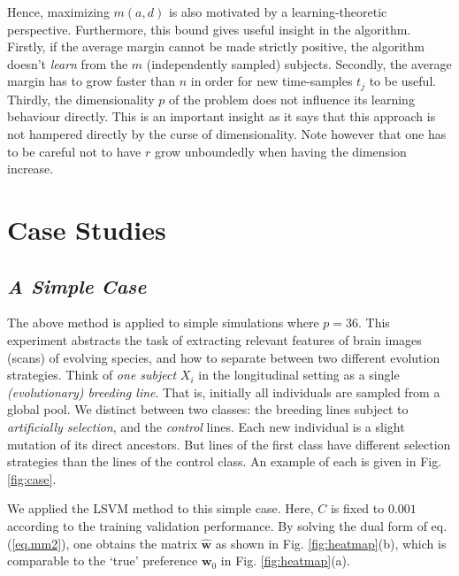 \documentclass[12pt,a4paper]{article}%
\newcommand{\wv}{\mathbf{w}}
\begin{document}
Hence, maximizing $m(a,d)$  is also motivated by a learning-theoretic perspective.
Furthermore, this bound gives useful insight in the algorithm.
Firstly, if the average margin cannot be made strictly positive, the algorithm doesn't {\em learn} from the $m$ (independently sampled) subjects.
Secondly, the average margin has to grow faster than $n$ in order for new time-samples $t_j$ to be useful.
Thirdly, the dimensionality $p$ of the problem does not influence its learning behaviour directly.
This is an important insight as it says that this approach is not hampered directly by the curse of dimensionality.
Note however that one has to be careful not to have $r$ grow unboundedly when having the dimension increase.



\section{Case Studies}

\subsection{{\em A Simple Case}}

The above method is applied to simple simulations where $p=36$.
This experiment abstracts the task of extracting relevant features of brain images (scans) of evolving species,
and how to separate between two different evolution strategies.
Think of {\em one subject} $X_i$ in the longitudinal setting as a single {\em (evolutionary) breeding line}.
That is, initially all individuals are sampled from a global pool.
We distinct between two classes: the breeding lines subject to {\em artificially selection}, and the {\em control} lines.
Each new individual is a slight mutation of its direct ancestors.
But lines of the first class have different selection strategies than the lines of the control class.
An example of each is given in Fig. \ref{fig:case}.

We applied the LSVM method to this simple case.
Here, $C$ is fixed to $0.001$ according to the training validation performance.
By solving the dual form of eq. (\ref{eq.mm2}), one obtains the matrix $\hat{\wv}$ as shown in Fig. \ref{fig:heatmap}(b),
which is comparable to the `true' preference $\wv_0$ in Fig. \ref{fig:heatmap}(a).
\end{document}
